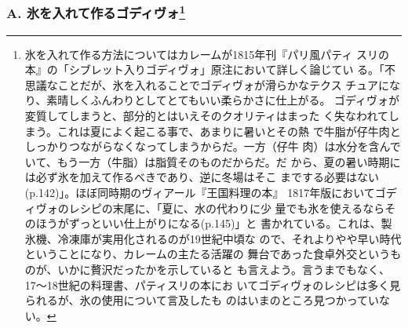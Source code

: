  
\begin{recette}
\hypertarget{godiveau-mouille-a-la-glace}{%
\subsubsection[A. 氷を入れて作るゴディヴォ]{\texorpdfstring{A.
氷を入れて作るゴディヴォ\footnote{氷を入れて作る方法についてはカレームが1815年刊『パリ風パティ
  スリの本』の「シブレット入りゴディヴォ」原注において詳しく論じてい
  る。「不思議なことだが、氷を入れることでゴディヴォが滑らかなテクス
  チュアになり、素晴しくふんわりとしてとてもいい柔らかさに仕上がる。
  ゴディヴォが変質してしまうと、部分的とはいえそのクオリティはまった
  く失なわれてしまう。これは夏によく起こる事で、あまりに暑いとその熱
  で牛脂が仔牛肉としっかりつながらなくなってしまうからだ。一方（仔牛
  肉）は水分を含んでいて、もう一方（牛脂）は脂質そのものだからだ。だ
  から、夏の暑い時期には必ず氷を加えて作るべきであり、逆に冬場はそこ
  までする必要はない(p.142)」。ほぼ同時期のヴィアール『王国料理の本』
  1817年版においてゴディヴォのレシピの末尾に、「夏に、水の代わりに少
  量でも氷を使えるならそのほうがずっといい仕上がりになる(p.145)」と
  書かれている。これは、製氷機、冷凍庫が実用化されるのが19世紀中頃な
  ので、それよりやや早い時代ということになり、カレームの主たる活躍の
  舞台であった食卓外交というものが、いかに贅沢だったかを示していると
  も言えよう。言うまでもなく、17〜18世紀の料理書、パティスリの本にお
  いてゴディヴォのレシピは多く見られるが、氷の使用について言及したも
  のはいまのところ見つかっていない。}}{A. 氷を入れて作るゴディヴォ}}\label{godiveau-mouille-a-la-glace}}




\end{recette}
